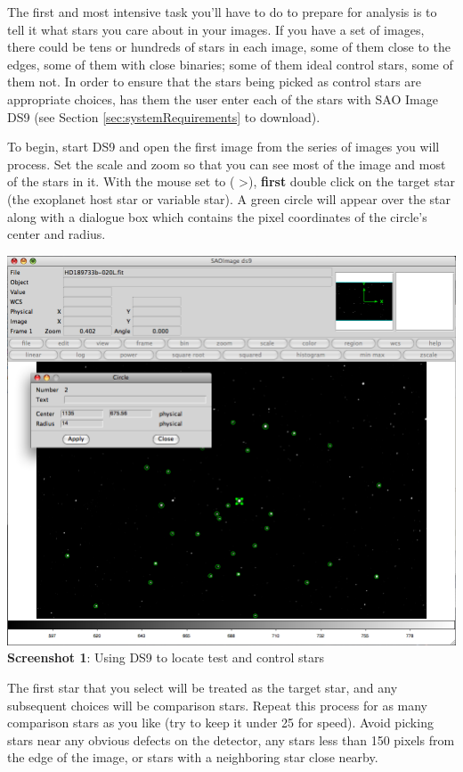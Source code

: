 \documentclass{article}
\begin{document}
The first and most intensive task you'll have to do to prepare \oscaar  for analysis is to tell it what stars you care about in your images. If you have a set of images, there could be tens or hundreds of stars in each image, some of them close to the edges, some of them with close binaries; some of them ideal control stars, some of them not. In order to ensure that the stars being picked as control stars are appropriate choices, \oscaar has them the user enter each of the stars with SAO Image DS9 (see Section \ref{sec:systemRequirements} to download). 

To begin, start DS9 and open the first image from the series of images you will process. Set the scale and zoom so that you can see most of the image and most of the stars in it. With the mouse set to  ( \textgreater  {}), \textbf{first} double click on the target star (the exoplanet host star or variable star). A green circle will appear over the star along with a dialogue box which contains the pixel coordinates of the circle's center and radius. 
\begin{center}
\includegraphics[scale=0.34]{imgs/ds9.png}
{\small \textbf{Screenshot 1}: Using DS9 to locate test and control stars}
\end{center}	
The first star that you select will be treated as the target star, and any subsequent choices will be comparison stars. Repeat this process for as many comparison stars as you like (try to keep it under 25 for speed). Avoid picking stars near any obvious defects on the detector, any stars less than 150 pixels from the edge of the image, or stars with a neighboring star close nearby. 
\end{document}
